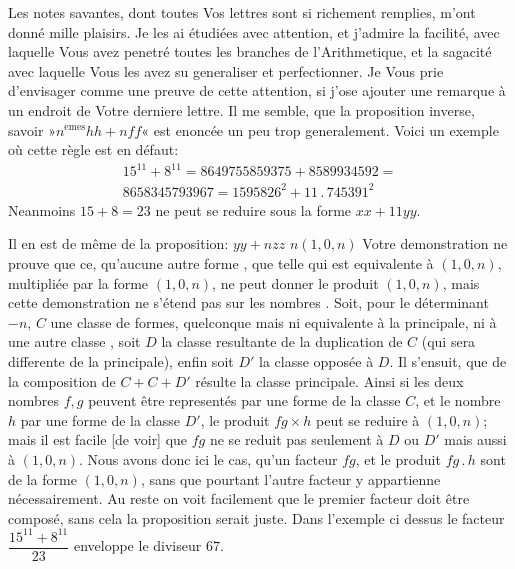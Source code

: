 Les notes savantes, dont toutes Vos lettres sont si richement remplies,
m’ont donné mille plaisirs. Je les ai étudiées avec attention, et j’admire la
facilité, avec laquelle Vous avez penetré toutes les branches de l’Arithmetique,
et la sagacité avec laquelle Vous les avez su generaliser et perfectionner. Je
Vous prie d’envisager comme une preuve de cette attention, si j’ose ajouter
une remarque à un endroit de Votre derniere lettre. Il me semble, que la
proposition inverse, savoir »$n^{\mathrm{emes}}$$hh+nff$« est enoncée un peu trop generalement.
Voici un exemple où cette règle est en défaut:
\[
\begin{gathered}
15^{11}+8^{11}=8649755859375+8589934592={}\\
8658345793967=1595826^2+11\mathpunct{.}745391^2
\end{gathered}
\]
\noindent Neanmoins $15+8=23$ ne peut se reduire sous la forme $xx+11yy$.

Il en est de même de la proposition: 
$yy+nzz$ \textls[100]{(}$n$$(1,0,n)$ Votre demonstration
ne prouve que ce, qu’aucune autre forme , que telle qui
est equivalente à $(1,0,n)$, multipliée par la forme $(1,0,n)$, ne peut donner le
produit $(1,0,n)$, mais cette demonstration ne s’étend pas sur les nombres
. Soit, pour le déterminant $-n$, $C$ une classe de formes, quelconque
mais ni equivalente à la principale, ni à une autre classe , soit $D$
la classe resultante de la duplication de $C$ (qui sera differente de la principale),
enfin soit $D'$ la classe opposée à $D$. Il s’ensuit, que de la composition
de $C+C+D'$ résulte la classe principale. Ainsi si les deux nombres $f,g$
peuvent être representés par une forme de la classe $C$, et le nombre $h$ par
une forme de la classe $D'$, le produit $fg\times h$ peut se reduire à $(1,0,n)$; mais
il est facile [de voir] que $fg$ ne se reduit pas seulement à $D$ ou $D'$ mais aussi à
$(1,0,n)$. Nous avons donc ici le cas, qu’un facteur $fg$, et le produit $fg\mathpunct{.}h$ sont
de la forme $(1,0,n)$, sans que pourtant l’autre facteur y appartienne nécessairement.
Au reste on voit facilement que le premier facteur doit être composé,
\clearpage
{}
\noindent sans cela la proposition serait juste. Dans l’exemple ci dessus le facteur
$\dfrac{15^{11}+8^{11}}{23}$ enveloppe le diviseur $67$.

